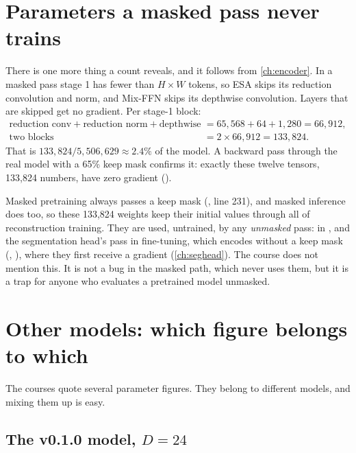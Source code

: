 \section{Parameters a masked pass never trains}\label{sec:params:idle}

There is one more thing a count reveals, and it follows from \cref{ch:encoder}. In a masked pass
stage 1 has fewer than $H \times W$ tokens, so ESA skips its reduction convolution and norm, and Mix-FFN
skips its depthwise convolution. Layers that are skipped get no gradient. Per stage-1 block:
\begin{align*}
\text{reduction conv} + \text{reduction norm} + \text{depthwise} &= 65{,}568 + 64 + 1{,}280 = 66{,}912,\\
\text{two blocks} &= 2 \times 66{,}912 = 133{,}824 .
\end{align*}
That is $133{,}824 / 5{,}506{,}629 \approx 2.4\%$ of the model\tagC. A backward pass through the real
model with a 65\% keep mask confirms it: exactly these twelve tensors, 133,824 numbers, have zero
gradient ().

\begin{sourcenote}
Masked pretraining always passes a keep mask
(, line 231), and masked
inference does too, so these 133,824 weights keep their initial values through all of reconstruction
training. They are used, untrained, by any \emph{unmasked} pass:  in
, and the segmentation head's pass in fine-tuning, which encodes without a keep mask
(, ), where they first receive a gradient
(\cref{ch:seghead}). The course does not mention this. It is not a bug in the masked path, which never
uses them, but it is a trap for anyone who evaluates a pretrained model unmasked.
\end{sourcenote}

\section{Other models: which figure belongs to which}\label{sec:params:others}

The courses quote several parameter figures. They belong to different models, and mixing them up is
easy.

\subsection{The v0.1.0 model, \texorpdfstring{$D = 24$}{D = 24}}

